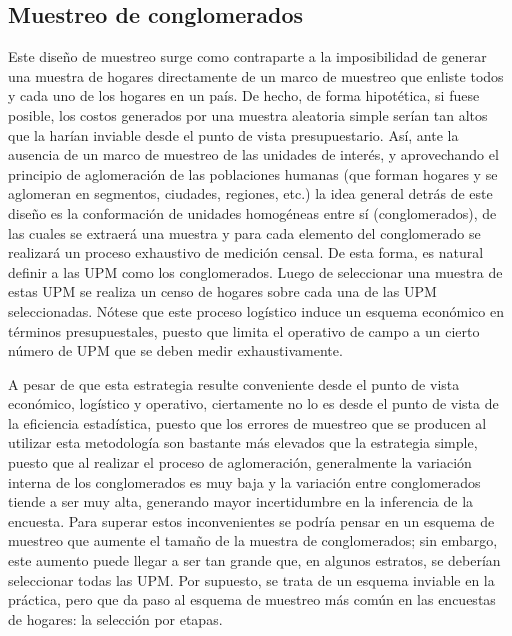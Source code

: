 \documentclass[12pt,spanish,]{book}
\begin{document}
\hypertarget{muestreo-de-conglomerados}{%
\subsection*{Muestreo de conglomerados}\label{muestreo-de-conglomerados}}

Este diseño de muestreo surge como contraparte a la imposibilidad de generar una muestra de hogares directamente de un marco de muestreo que enliste todos y cada uno de los hogares en un país. De hecho, de forma hipotética, si fuese posible, los costos generados por una muestra aleatoria simple serían tan altos que la harían inviable desde el punto de vista presupuestario. Así, ante la ausencia de un marco de muestreo de las unidades de interés, y aprovechando el principio de aglomeración de las poblaciones humanas (que forman hogares y se aglomeran en segmentos, ciudades, regiones, etc.) la idea general detrás de este diseño es la conformación de unidades homogéneas entre sí (conglomerados), de las cuales se extraerá una muestra y para cada elemento del conglomerado se realizará un proceso exhaustivo de medición censal. De esta forma, es natural definir a las UPM como los conglomerados. Luego de seleccionar una muestra de estas UPM se realiza un censo de hogares sobre cada una de las UPM seleccionadas. Nótese que este proceso logístico induce un esquema económico en términos presupuestales, puesto que limita el operativo de campo a un cierto número de UPM que se deben medir exhaustivamente.

A pesar de que esta estrategia resulte conveniente desde el punto de vista económico, logístico y operativo, ciertamente no lo es desde el punto de vista de la eficiencia estadística, puesto que los errores de muestreo que se producen al utilizar esta metodología son bastante más elevados que la estrategia simple, puesto que al realizar el proceso de aglomeración, generalmente la variación interna de los conglomerados es muy baja y la variación entre conglomerados tiende a ser muy alta, generando mayor incertidumbre en la inferencia de la encuesta. Para superar estos inconvenientes se podría pensar en un esquema de muestreo que aumente el tamaño de la muestra de conglomerados; sin embargo, este aumento puede llegar a ser tan grande que, en algunos estratos, se deberían seleccionar todas las UPM. Por supuesto, se trata de un esquema inviable en la práctica, pero que da paso al esquema de muestreo más común en las encuestas de hogares: la selección por etapas.
\end{document}
